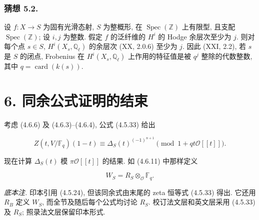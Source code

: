 \subsubsection*{猜想 5.2.}
设 $f:X\to S$ 为固有光滑态射, $S$ 为整概形, 在 $\operatorname{Spec}(\mathbb Z)$ 上有限型,
且支配 $\operatorname{Spec}(\mathbb Z)$; 设 $i,j$ 为整数.
假定 $f$ 的泛纤维的 $H^i$ 的 Hodge 余层次至少为 $j$.
则对每个点 $s\in S$, $H^i(X_s,\mathbb Q_\ell)$ 的余层次 (XX, 2.0.6) 至少为 $j$.
因此 (XXI, 2.2), 若 $s$ 是 $S$ 的闭点, Frobenius 在 $H^i(X_s,\mathbb Q_\ell)$
上作用的特征值是被 $q^j$ 整除的代数整数, 其中 $q=\operatorname{card}(k(s))$.

\section*{6. 同余公式证明的结束}

考虑 (4.6.6) 及 (4.6.3)--(4.6.4), 公式 (4.5.33) 给出

\begin{equation}\tag{6.0.1}
Z(t,V/\mathbb F_q)(1-t)
\equiv\Delta_S(t)^{(-1)^{n+1}}
\pmod{1+qt\mathcal O[[t]]}.
\end{equation}

现在计算 $\Delta_S(t)$ 模 $\pi\mathcal O[[t]]$ 的结果. 如 (4.6.11) 中那样定义

\begin{equation}\tag{6.0.2}
W_S=R_S\otimes_{\mathcal O}\mathbb F_q.
\end{equation}

\medskip
\noindent\emph{底本注.}
印本引用 (4.5.24), 但该同余式由末尾的 zeta 恒等式 (4.5.33) 得出.
它还用 $R_B$ 定义 $W_S$, 而全节及随后每个公式均讨论 $R_S$.
校订法文层和英文层采用 (4.5.33) 及 $R_S$; 照录法文层保留印本形式.
